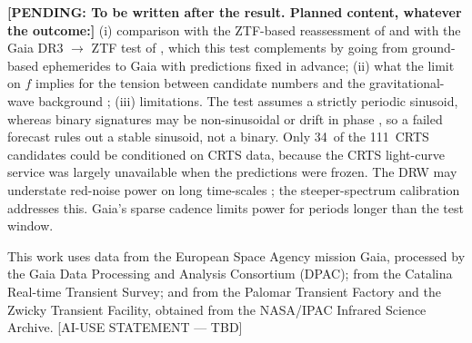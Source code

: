 \documentclass[RNAAS]{aastex631}
\newcommand{\NG}{111}                     %
\newcommand{\NGcrts}{34}                 %
\newcommand{\pending}[1]{\textbf{[PENDING: #1]}}
\begin{document}
\pending{To be written after the result. Planned content, whatever the outcome:}
(i) comparison with the ZTF-based reassessment of \citet{Foustoul2025} and with the Gaia DR3
$\rightarrow$ ZTF test of \citet{ElBadry2026}, which this test complements by going from ground-based
ephemerides to Gaia with predictions fixed in advance; (ii) what the limit on $f$ implies for
the tension between candidate numbers and the gravitational-wave background
\citep{Sesana2018, NANOGrav2023}; (iii) limitations. The test assumes a strictly periodic
sinusoid, whereas binary signatures may be non-sinusoidal or drift in phase \citep{Lin2026}, so a
failed forecast rules out a stable sinusoid, not a binary. Only \NGcrts\ of the \NG\ CRTS
candidates could be conditioned on CRTS data, because the CRTS light-curve service was largely
unavailable when the predictions were frozen. The DRW may understate red-noise power on long
time-scales \citep{Vaughan2016}; the steeper-spectrum calibration addresses this. Gaia's sparse
cadence limits power for periods longer than the test window.

\begin{acknowledgments}
This work uses data from the European Space Agency mission Gaia, processed by the Gaia Data
Processing and Analysis Consortium (DPAC); from the Catalina Real-time Transient Survey;
and from the Palomar Transient Factory and the Zwicky Transient Facility, obtained from the
NASA/IPAC Infrared Science Archive. [AI-USE STATEMENT --- TBD]
\end{acknowledgments}




\end{document}
